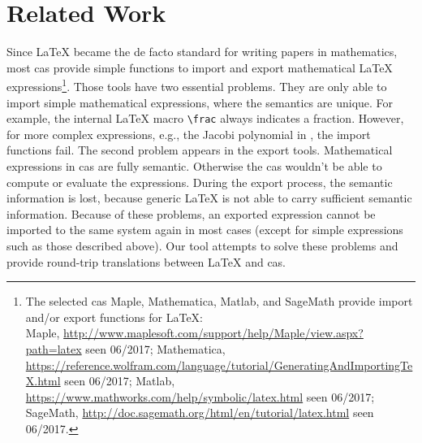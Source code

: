 \documentclass[a4paper,11pt]{article}
\theoremstyle{defTheoStyle}
\theoremstyle{defExampStyle}
\begin{document}
\section{Related Work}\label{sec:related-work}
Since \LaTeX{} became the de facto standard for writing papers in mathematics, most \gls*{cas} provide simple functions to import and export mathematical \LaTeX{} expressions\footnote{The selected \gls*{cas} Maple, Mathematica, Matlab, and SageMath provide import and/or export functions for \LaTeX:\\
Maple, \url{http://www.maplesoft.com/support/help/Maple/view.aspx?path=latex} seen 06/2017;
Mathematica, \url{https://reference.wolfram.com/language/tutorial/GeneratingAndImportingTeX.html} seen 06/2017;
Matlab, \url{https://www.mathworks.com/help/symbolic/latex.html} seen 06/2017;
SageMath, \url{http://doc.sagemath.org/html/en/tutorial/latex.html} seen 06/2017.}. Those tools have two essential problems. They are only able to import simple mathematical expressions, where the semantics are unique. For example, the internal \LaTeX{} macro \verb|\frac| always indicates a fraction. However, for more complex expressions, e.g., the Jacobi polynomial in , the import functions fail. The second problem appears in the export tools. Mathematical expressions in \gls*{cas} are fully semantic. Otherwise the \gls*{cas} wouldn't be able to compute or evaluate the expressions. During the export process, the semantic information is lost, because generic \LaTeX{} is not able to carry sufficient semantic information. Because of these problems, an exported expression cannot be imported to the same system again in most cases (except for simple expressions such as those described above). Our tool attempts to solve these problems and provide round-trip translations between \LaTeX{} and \gls*{cas}.
\end{document}
